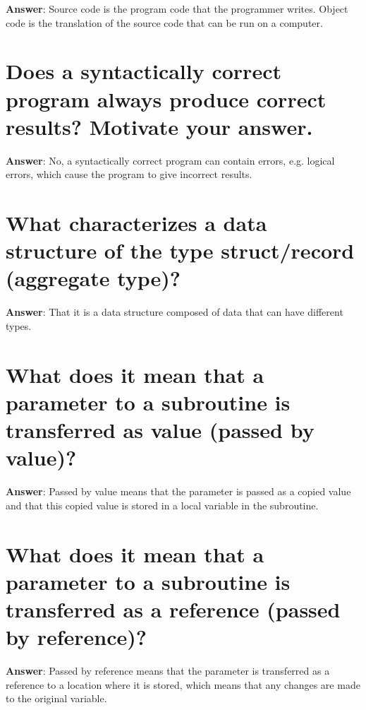 \documentclass[a4paper,11pt,oneside]{book}
\begin{document}
\begin{sloppypar}
\textbf{Answer}: Source code is the program code that the programmer writes. Object code is the translation of the source code that can be run on a computer.



\section{Does a syntactically correct program always produce correct results? Motivate your answer.}

\label{q:193:sa:en:True}

\textbf{Answer}: No, a syntactically correct program can contain errors, e.g. logical errors, which cause the program to give incorrect results.



\section{What characterizes a data structure of the type struct/record (aggregate type)?}

\label{q:194:sa:en:True}

\textbf{Answer}: That it is a data structure composed of data that can have different types.



\section{What does it mean that a parameter to a subroutine is transferred as value (passed by value)?}

\label{q:195:sa:en:True}

\textbf{Answer}: Passed by value means that the parameter is passed as a copied value and that this copied value is stored in a local variable in the subroutine.



\section{What does it mean that a parameter to a subroutine is transferred as a reference (passed by reference)?}

\label{q:196:sa:en:True}

\textbf{Answer}: Passed by reference means that the parameter is transferred as a reference to a location where it is stored, which means that any changes are made to the original variable.




\end{sloppypar}
\end{document}
